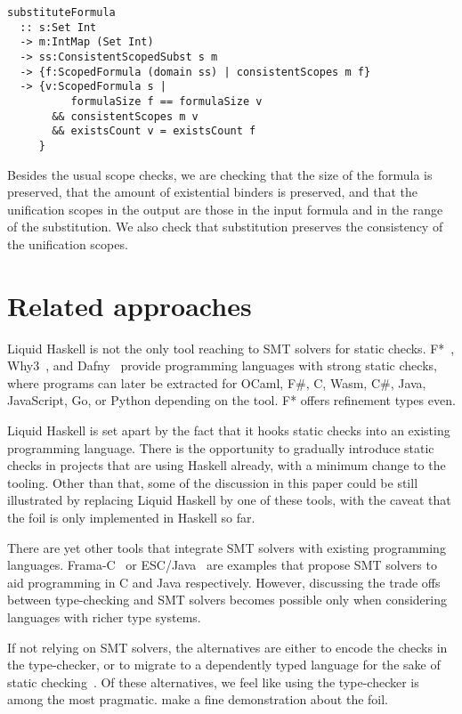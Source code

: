 \documentclass[sigconf, review]{acmart}
\begin{document}
\begin{verbatim}
substituteFormula
  :: s:Set Int
  -> m:IntMap (Set Int)
  -> ss:ConsistentScopedSubst s m
  -> {f:ScopedFormula (domain ss) | consistentScopes m f}
  -> {v:ScopedFormula s |
          formulaSize f == formulaSize v
       && consistentScopes m v
       && existsCount v = existsCount f
     }
\end{verbatim}
Besides the usual scope checks, we are checking that the size of the formula
is preserved, that the amount of existential binders is preserved, and that
the unification scopes in the output are those in the input formula and in
the range of the substitution. We also check that substitution preserves
the consistency of the unification scopes.

\section{Related approaches}

Liquid Haskell is not the only tool reaching to SMT solvers for static checks.
F*~\cite{swamy16}, Why3~\cite{filli13}, and Dafny~\cite{leino17} provide
programming languages with strong static checks, where programs can later
be extracted for OCaml, F\#, C, Wasm, C\#, Java, JavaScript, Go, or Python
depending on the tool. F* offers refinement types even.

Liquid Haskell is set apart by the fact that it hooks static checks into an
existing programming language. There is the  opportunity to gradually introduce
static checks in projects that are using Haskell already, with a minimum change
to the tooling. Other than that, some of the discussion in this paper could
be still illustrated by replacing Liquid Haskell by one of these tools, with
the caveat that the foil is only implemented in Haskell so far.

There are yet other tools that integrate SMT solvers with existing programming
languages. Frama-C~\cite{kosmatov24} or ESC/Java~\cite{flanagan02} are examples that
propose SMT solvers to aid programming in C and Java respectively. However,
discussing the trade offs between type-checking and SMT solvers becomes possible
only when considering languages with richer type systems.

If not relying on SMT solvers, the alternatives are either to encode the
checks in the type-checker, or to migrate to a dependently typed language for the sake of
static checking~\cite{haftmann10, breitner18, carr22}. Of these alternatives,
we feel like using the type-checker is among the most pragmatic.  make
a fine demonstration about the foil.
\end{document}

